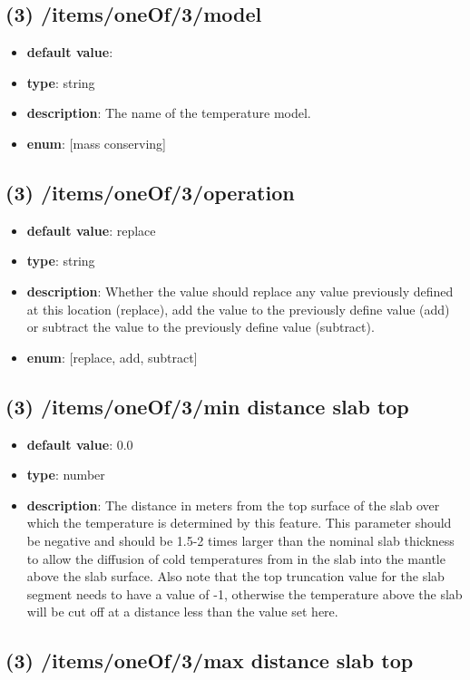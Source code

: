 \subsection{(3) /items/oneOf/3/model}
\begin{itemize}[leftmargin=3em]\item {\bf default value}: 
\item {\bf type}: string
\item {\bf description}: The name of the temperature model.
\item {\bf enum}: [mass conserving]\end{itemize}\subsection{(3) /items/oneOf/3/operation}
\begin{itemize}[leftmargin=3em]\item {\bf default value}: replace
\item {\bf type}: string
\item {\bf description}: Whether the value should replace any value previously defined at this location (replace), add the value to the previously define value (add) or subtract the value to the previously define value (subtract).
\item {\bf enum}: [replace, add, subtract]\end{itemize}\subsection{(3) /items/oneOf/3/min distance slab top}
\begin{itemize}[leftmargin=3em]\item {\bf default value}: 0.0
\item {\bf type}: number
\item {\bf description}: The distance in meters from the top surface of the slab over which the temperature is determined by this feature. This parameter should be negative and should be 1.5-2 times larger than the nominal slab thickness to allow the diffusion of cold temperatures from in the slab into the mantle above the slab surface. Also note that the top truncation value for the slab segment needs to have a value of -1, otherwise the temperature above the slab will be cut off at a distance less than the value set here.
\end{itemize}\subsection{(3) /items/oneOf/3/max distance slab top}
